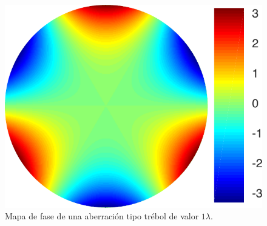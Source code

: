 \begin{figure}[h!]
\centering
\includegraphics[scale=.4]{trefoil.pdf}
\caption[Aberración tipo trébol.]{Mapa de fase de una aberración tipo
  trébol de valor $1\lambda$.} 
\label{fig:trefoil_aber}
\end{figure} 

